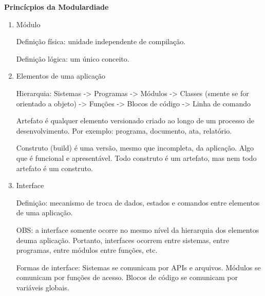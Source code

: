 \documentclass[
	12pt, %
]{fphw}
\begin{document}
\textbf{Princícpios da Modulardiade}

\begin{enumerate}

    \item Módulo

    Definição física: unidade independente de compilação.

    Definição lógica: um único conceito.

    \item Elementos de uma aplicação
    
    Hierarquia: Sistemas -> Programas -> Módulos -> Classes (smente se for orientado a objeto) -> Funções -> Blocos de código -> Linha de comando

    Artefato é qualquer elemento versionado criado ao longo de um processo de desenvolvimento. Por exemplo: programa, documento, ata, relatório.

    Construto (build) é uma versão, mesmo que incompleta, da aplicação. Algo que é funcional e apresentável. Todo construto é um artefato, mas nem todo artefato é um construto.

    \item Interface
    
    Definição: mecanismo de troca de dados, estados e comandos entre elementos de uma aplicação.
    
    OBS: a interface somente ocorre no mesmo nível da hierarquia dos elementos deuma aplicação. Portanto, interfaces ocorrem entre sistemas, entre programas, entre módulos entre funções, etc.

    Formas de interface: Sistemas se comunicam por APIs e arquivos. Módulos se comunicam por funções de acesso. Blocos de código se comunicam por variáveis globais.
    
\end{enumerate}



\end{document}
